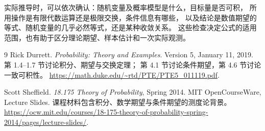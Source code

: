 \documentclass[UTF8]{ctexart}
\begin{document}
实际推导时，可以依次确认：随机变量及概率模型是什么，目标量是否可积，
所用操作是有限代数运算还是极限交换，条件信息有哪些，
以及结论是数值期望的等式、随机变量的几乎必然等式，还是某种收敛关系。
这些检查决定公式的适用范围，也有助于区分理论期望、样本估计和一次实际观测。

\begin{thebibliography}{9}
Rick Durrett.
\emph{Probability: Theory and Examples}.
Version 5, January 11, 2019.
第 1.4--1.7 节讨论积分、期望与交换定理；
第 4.1 节讨论条件期望，第 4.6 节讨论一致可积性。
\url{https://math.duke.edu/~rtd/PTE/PTE5_011119.pdf}.

Scott Sheffield.
\emph{18.175 Theory of Probability}, Spring 2014.
MIT OpenCourseWare, Lecture Slides.
课程材料包含积分、数学期望与条件期望的测度论背景。
\url{https://ocw.mit.edu/courses/18-175-theory-of-probability-spring-2014/pages/lecture-slides/}.
\end{thebibliography}
\end{document}
